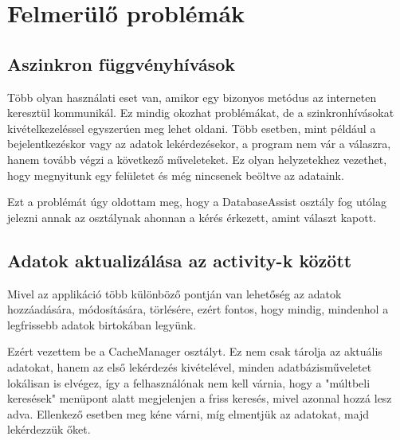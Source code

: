 \section{Felmerülő problémák}\label{sec:ALAP:adatelem}


\subsection{Aszinkron függvényhívások}\label{sec:ALAP:adatelem}

Több olyan használati eset van, amikor egy bizonyos metódus az interneten keresztül kommunikál. Ez mindig okozhat problémákat, de a szinkronhívásokat kivételkezeléssel egyszerúen meg lehet oldani. Több esetben, mint például a bejelentkezéskor vagy az adatok lekérdezésekor, a program nem vár a válaszra, hanem tovább végzi a következő műveleteket. Ez olyan helyzetekhez vezethet, hogy megnyitunk egy felületet és még nincsenek beöltve az adataink. 

Ezt a problémát úgy oldottam meg, hogy a DatabaseAssist osztály fog utólag jelezni annak az osztálynak ahonnan a kérés érkezett, amint választ kapott.


\subsection{Adatok aktualizálása az activity-k között}\label{sec:ALAP:adatelem}

Mivel az applikáció több különböző pontján van lehetőség az adatok hozzáadására, módosítására, törlésére, ezért fontos, hogy mindig, mindenhol a legfrissebb adatok birtokában legyünk.

Ezért vezettem be a CacheManager osztályt. Ez nem csak tárolja az aktuális adatokat, hanem az első lekérdezés kivételével, minden adatbázisműveletet lokálisan is elvégez, így a felhasználónak nem kell várnia, hogy a "múltbeli keresések" menüpont alatt megjelenjen a friss keresés, mivel azonnal hozzá lesz adva. Ellenkező esetben meg kéne várni, míg elmentjük az adatokat, majd lekérdezzük őket.
